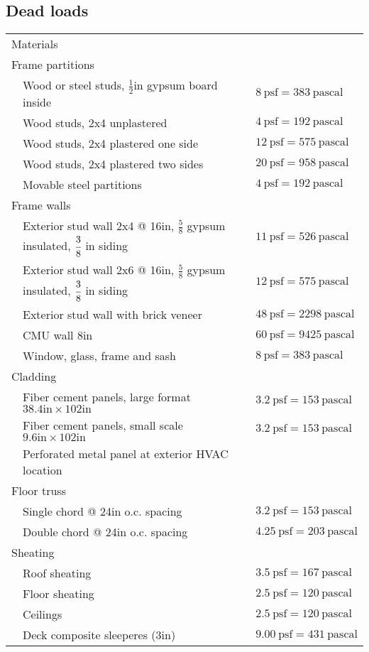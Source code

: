 
\subsection{Dead loads}
\begin{table}[h!]
\begin{tabular}{lp{8cm}p{10cm}}
\multicolumn{3}{l}{Materials}\\


\multicolumn{3}{l}{Frame partitions}\\
& Wood or steel studs, $\frac{1}{2}$in gypsum board inside & $8\ \mathrm{psf}= 383 \ \mathrm{pascal}$ \\
& Wood studs, 2x4 unplastered & $4\ \mathrm{psf}=192 \ \mathrm{pascal}$\\
& Wood studs, 2x4 plastered one side & $12\ \mathrm{psf}= 575\ \mathrm{pascal}$\\
& Wood studs, 2x4 plastered two sides & $20\ \mathrm{psf}=958 \ \mathrm{pascal}$\\
& Movable steel partitions &  $4\ \mathrm{psf}=192 \ \mathrm{pascal}$\\
\multicolumn{3}{l}{Frame walls}\\
& Exterior stud wall 2x4 @ 16in, $\frac{5}{8}$ gypsum insulated, $\cfrac{3}{8}$ in siding &  $11\ \mathrm{psf}=526 \ \mathrm{pascal}$\\
& Exterior stud wall 2x6 @ 16in, $\frac{5}{8}$ gypsum insulated, $\cfrac{3}{8}$ in siding &  $12\ \mathrm{psf}=575 \ \mathrm{pascal}$\\
& Exterior stud wall with brick veneer &   $48\ \mathrm{psf}=2298 \ \mathrm{pascal}$\\
& CMU wall 8in &   $60\ \mathrm{psf}=9425 \ \mathrm{pascal}$\\
& Window, glass, frame and sash & $8\ \mathrm{psf}=383 \ \mathrm{pascal}$\\
\multicolumn{3}{l}{Cladding}\\
& Fiber cement panels, large format $38.4\text{in} \times 102\text{in}$ & $3.2\ \mathrm{psf} = 153\ \mathrm{pascal}$ \\
& Fiber cement panels, small scale $9.6\text{in} \times 102\text{in}$ & $3.2\ \mathrm{psf} = 153\ \mathrm{pascal}$ \\
& Perforated metal panel at exterior HVAC location & \\
\multicolumn{3}{l}{Floor truss}\\
& Single chord @ 24in o.c. spacing & $3.2\ \mathrm{psf} = 153\ \mathrm{pascal}$ \\
& Double chord @ 24in o.c. spacing & $4.25\ \mathrm{psf} = 203\ \mathrm{pascal}$ \\
\multicolumn{3}{l}{Sheating}\\
& Roof sheating & $ 3.5\ \mathrm{psf} = 167\ \mathrm{pascal}$ \\
& Floor sheating & $ 2.5\ \mathrm{psf} = 120\ \mathrm{pascal}$ \\
& Ceilings & $ 2.5\ \mathrm{psf} = 120\ \mathrm{pascal}$ \\
& Deck composite sleeperes (3in) &  $9.00\ \mathrm{psf} = 431\ \mathrm{pascal}$ \\
\end{tabular}
\end{table}

